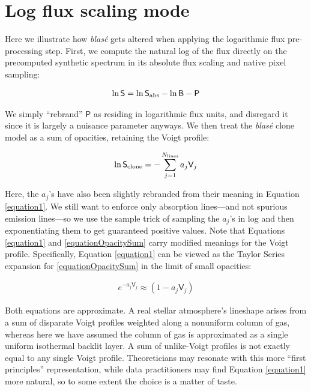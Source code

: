 \documentclass[trackchanges]{aastex631}
\begin{document}



\clearpage

\appendix
\restartappendixnumbering

\section{Log flux scaling mode} \label{appendixLogScale}

Here we illustrate how  \emph{blas\'e} gets altered when applying the logarithmic flux pre-processing step.  First, we compute the natural log of the flux directly on the precomputed synthetic spectrum in its absolute flux scaling and native pixel sampling:

\begin{eqnarray}
    \ln{\mathsf{S}} = \ln{\mathsf{S}_{\rm abs}} - \ln{\mathsf{B}} - \mathsf{P}
    \label{eqnlogFlat}
\end{eqnarray}

We simply ``rebrand'' $\mathsf{P}$ as residing in logarithmic flux units, and disregard it since it is largely a nuisance parameter anyways.  We then treat the  \emph{blas\'e} clone model as a sum of opacities, retaining the Voigt profile:

\begin{eqnarray}
    \ln{\mathsf{S}_{\rm clone}} = -\sum_{j=1}^{N_{\mathrm{lines}}} a_j \mathsf{V}_j \label{equationOpacitySum}
\end{eqnarray}

Here, the $a_j$'s have also been slightly rebranded from their meaning in Equation \ref{equation1}.  We still want to enforce only absorption lines---and not spurious emission lines---so we use the sample trick of sampling the $a_j$'s in log and then exponentiating them to get guaranteed positive values.  Note that Equations \ref{equation1} and \ref{equationOpacitySum} carry modified meanings for the Voigt profile.  Specifically, Equation \ref{equation1} can be viewed as the Taylor Series expansion for \ref{equationOpacitySum} in the limit of small opacities:

\begin{eqnarray}
    e^{-a_j \mathsf{V}_j} \approx (1-a_j\mathsf{V}_j) \label{eqnTaylor}
\end{eqnarray}

Both equations are approximate. A real stellar atmosphere's lineshape arises from a sum of disparate Voigt profiles weighted along a nonuniform column of gas, whereas here we have assumed the column of gas is approximated as a single uniform isothermal backlit layer.  A sum of unlike-Voigt profiles is not exactly equal to any single Voigt profile.  Theoreticians may resonate with this more ``first principles'' representation, while data practitioners may find Equation \ref{equation1} more natural, so to some extent the choice is a matter of taste.
\end{document}
